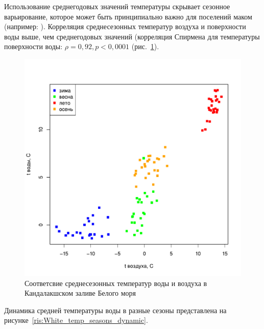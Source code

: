 Использование среднегодовых значений температуры скрывает сезонное варьирование, которое может быть принципиально важно для поселений маком (например: \cite{Beukema_et_al_1998, Beukema_Dekker_2003, Beukema_et_al_2009}). 
Корреляция среднесезонных температур воздуха и поверхности воды выше, чем среднегодовых значений (корреляция Спирмена для температуры поверхности воды: $\rho = 0,92, p < 0,0001$ (рис.~\ref{ris:White_temp_water_vs_air_seasons}). 
	\begin{figure}[p]
    \includegraphics[width=\textwidth]{../temperatures_water_air/temp_air_water1.pdf}
    \caption{Соответсвие среднесезонных температур воды и воздуха в Кандалакшском заливе Белого моря}
    \label{ris:White_temp_water_vs_air_seasons}
	\end{figure}
Динамика средней температуры воды в разные сезоны представлена на рисунке~\ref{ris:White_temp_seasons_dynamic}.
